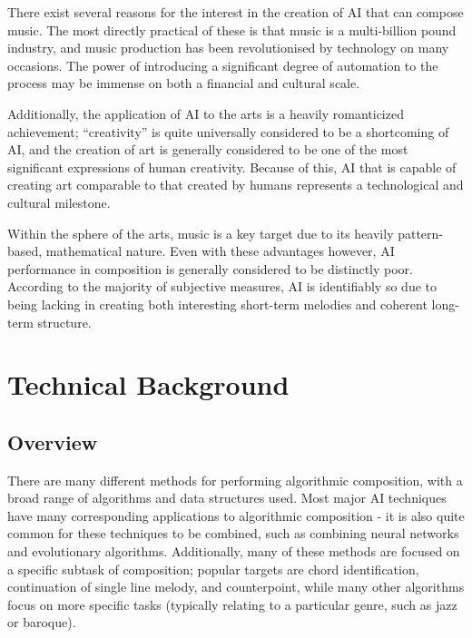 \documentclass[ author={Stephen Livermore-Tozer},
				supervisor={Dr. Peter Flach},
				degree={MEng},
				title={Performing Algorithmic Co-composition Using Machine Learning},
				subtitle={},
				type={research},
				year={2016} ]{dissertation}
\begin{document}
	
	
	There exist several reasons for the interest in the creation of AI that can compose music. The most directly practical of these is that music is a multi-billion pound industry, and music production has been revolutionised by technology on many occasions. The power of introducing a significant degree of automation to the process may be immense on both a financial and cultural scale.
	
	Additionally, the application of AI to the arts is a heavily romanticized achievement; ``creativity'' is quite universally considered to be a shortcoming of AI, and the creation of art is generally considered to be one of the most significant expressions of human creativity. Because of this, AI that is capable of creating art comparable to that created by humans represents a technological and cultural milestone.
	
	Within the sphere of the arts, music is a key target due to its heavily pattern-based, mathematical nature. Even with these advantages however, AI performance in composition is generally considered to be distinctly poor. According to the majority of subjective measures, AI is identifiably so due to being lacking in creating both interesting short-term melodies and coherent long-term structure. 
	
	
	
	
	\chapter{Technical Background}
	\label{chap:technical}
	
	\section{Overview}
	
	There are many different methods for performing algorithmic composition, with a broad range of algorithms and data structures used. Most major AI techniques have many corresponding applications to algorithmic composition - it is also quite common for these techniques to be combined, such as combining neural networks and evolutionary algorithms. %
	Additionally, many of these methods are focused on a specific subtask of composition; popular targets are chord identification, continuation of single line melody, and counterpoint, while many other algorithms focus on more specific tasks (typically relating to a particular genre, such as jazz or baroque). 
	
\end{document}
